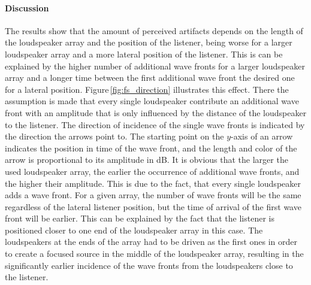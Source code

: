 \paragraph{Discussion}
The results show that the amount of perceived artifacts depends on the length of
the loudspeaker array and the position of the listener, being worse for a larger
loudspeaker array and a more lateral position of the listener. This is can be
explained by the higher number of additional wave fronts for a larger
loudspeaker array and a longer time between the first additional wave front the
desired one for a lateral position. Figure\,\ref{fig:fs_direction} illustrates
this effect. There the assumption is made that every single loudspeaker
contribute an additional wave front with an amplitude that is only influenced by
the distance of the loudspeaker to the listener. The direction of incidence of
the single wave fronts is indicated by the direction the arrows point to.
The starting point on the $y$-axis of an arrow indicates the position in time
of the wave front, and the length and color of the arrow is proportional to
its amplitude in dB.
It is obvious that the larger the used
loudspeaker array, the earlier the occurrence of additional wave fronts, and the
higher their amplitude. This is due to the fact, that every single loudspeaker
adds a wave front.  For a given array, the number of wave fronts will be the
same regardless of the lateral listener position, but the time of arrival of the
first wave front will be earlier. This can be explained by the fact that the
listener is positioned closer to one end of the loudspeaker array in this case.
The loudspeakers at the ends of the array had to be driven as the first ones in
order to create a focused source in the middle of the loudspeaker array,
resulting in the significantly earlier incidence of the wave fronts from the
loudspeakers close to the listener.

